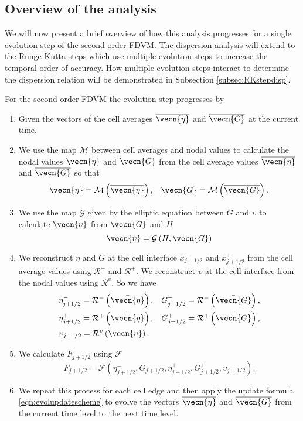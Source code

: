 \subsection{Overview of the analysis}
We will now present a brief overview of how this analysis progresses for a single evolution step of the second-order FDVM. The dispersion analysis will extend to the Runge-Kutta steps which use multiple evolution steps to increase the temporal order of accuracy. How multiple evolution steps interact to determine the dispersion relation will be demonstrated in Subsection \ref{subsec:RKstepdisp}.

For the second-order FDVM the evolution step progresses by
\begin{enumerate}
	\item Given the vectors of the cell averages $\overline{\vecn{\eta}}$ and $\overline{\vecn{G}}$ at the current time.
	\item We use the map $\mathcal{M}$ between cell averages and nodal values to calculate the nodal values ${\vecn{\eta}}$ and ${\vecn{G}}$ from the cell average values $\overline{\vecn{\eta}}$ and $\overline{\vecn{G}}$ so that
	\begin{align*}
	&{\vecn{\eta}} = \mathcal{M}\left(\overline{\vecn{\eta}} \right), 
	&{\vecn{G}} = \mathcal{M}\left(\overline{\vecn{G}} \right). 
	\end{align*}
	\item We use the map $\mathcal{G}$ given by the elliptic equation between $G$ and $\upsilon$ to calculate ${\vecn{\upsilon}}$ from ${\vecn{G}}$ and $H$
	\[{\vecn{\upsilon}} = \mathcal{G}\left(H, {\vecn{G}}\right)\]
	\item We reconstruct $\eta$ and $G$ at the cell interface $x^-_{j+1/2}$ and $x^+_{j+1/2}$ from the cell average values using $\mathcal{R}^{-}$ and $\mathcal{R}^{+}$. We reconstruct $\upsilon$ at the cell interface from the nodal values using $\mathcal{R}^{\upsilon}$. So we have
	\begin{align*}
	&\eta^-_{j+1/2} = \mathcal{R}^{-}\left(\bar{\vecn{\eta}}\right),  &G^-_{j+1/2} = \mathcal{R}^{-}\left(\bar{\vecn{G}}\right), \\
	&\eta^+_{j+1/2} = \mathcal{R}^{+}\left(\bar{\vecn{\eta}}\right),  &G^+_{j+1/2} = \mathcal{R}^{+}\left(\bar{\vecn{G}}\right), \\
	&\upsilon_{j+1/2} = \mathcal{R}^{\upsilon}\left({\vecn{\upsilon}}\right).
	\end{align*}
	\item We calculate $F_{j+1/2}$ using $\mathcal{F}$
	\[F_{j+1/2} =\mathcal{F} \left(\eta^-_{j+1/2}, G^-_{j+1/2},\eta^+_{j+1/2}, G^+_{j+1/2},\upsilon_{j+1/2}  \right). \]
	\item We repeat this process for each cell edge and then apply the update formula \eqref{eqn:evolupdatescheme} to evolve the vectors $\overline{\vecn{\eta}}$ and $\overline{\vecn{G}}$ from the current time level to the next time level.
\end{enumerate}
